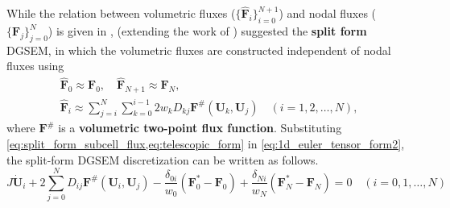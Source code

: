 \documentclass[a4paper,11pt,oneside]{article}
\newcommand{\newword}[1]{\textbf{#1}} %
\newcommand{\citear}[1]{\citeauthor{#1} \cite{#1}} %
\newcommand{\vect}[1]{\ensuremath{\boldsymbol{\mathbf{#1}}}} %
\newcommand{\eulerref}[1]{\ensuremath{#1}} %
\begin{document}
While the relation between volumetric fluxes ($\{\hat{\vect{\eulerref{F}}}_i\}_{i=0}^{N+1}$) and nodal fluxes ($\{\vect{\eulerref{F}}_j\}_{j=0}^{N}$) is given in \cite{fisherCarpenterNordstrom2013}, \citear{gassnerWintersKopriva2016} (extending the work of \citear{fisherCarpenter2013}) suggested the \newword{split form} DGSEM, in which the volumetric fluxes are constructed independent of nodal fluxes using
\begin{equation}
	\begin{gathered}
		\hat{\vect{\eulerref{F}}}_0 \approx \vect{\eulerref{F}}_0, \quad \hat{\vect{\eulerref{F}}}_{N+1} \approx \vect{\eulerref{F}}_N,\\
		\hat{\vect{\eulerref{F}}}_i \approx \sum_{j=i}^{N} \sum_{k=0}^{i-1} 2 w_k D_{kj} \vect{\eulerref{F}}^\#(\vect{\eulerref{U}}_k, \vect{\eulerref{U}}_j)\quad (i=1,2,\ldots,N),
	\end{gathered}
	\label{eq:split_form_subcell_flux}
\end{equation}
where $\vect{\eulerref{F}}^\#$ is a \newword{volumetric two-point flux function}. Substituting \cref{eq:split_form_subcell_flux,eq:telescopic_form} in \cref{eq:1d_euler_tensor_form2}, the split-form DGSEM discretization can be written as follows.
\begin{equation}
	J \dot{\vect{\eulerref{U}}}_i + 2\sum_{j=0}^{N} D_{ij} \vect{\eulerref{F}}^\#(\vect{\eulerref{U}}_i, \vect{\eulerref{U}}_j) - \frac{\delta_{0i}}{w_0} \left( \vect{\eulerref{F}}^*_0 - \vect{\eulerref{F}}_0 \right) + \frac{\delta_{Ni}}{w_N} \left( \vect{\eulerref{F}}^*_N - \vect{\eulerref{F}}_N \right) = 0 \quad (i=0,1,\ldots,N)
	\label{eq:1d_euler_tensor_form3}
\end{equation}
\end{document}
